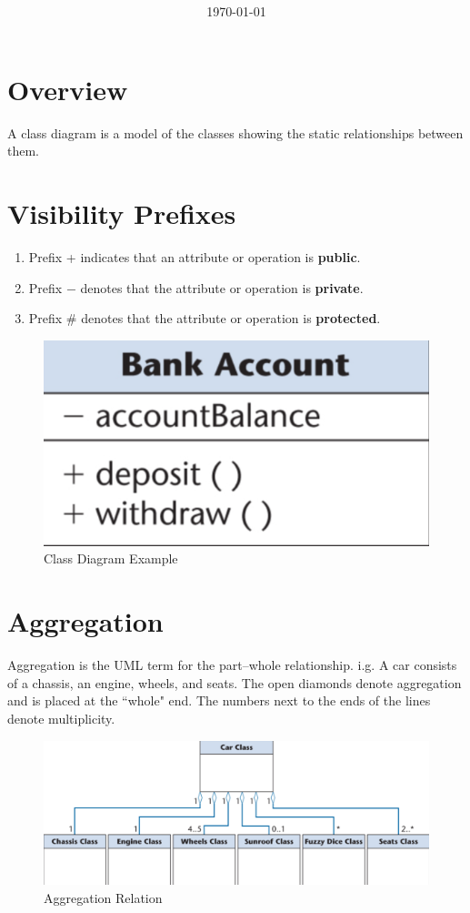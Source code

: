 \documentclass[11pt]{article}
\title{\textbf{\Topic}}
\author{\Name}
\date{\today}
\begin{document}
\maketitle
\noindent\makebox[\linewidth]{\rule[8pt]{5in}{0.5pt}}

\section*{Overview}

A class diagram is a model of the classes showing the static relationships between them.

\section*{Visibility Prefixes}

\begin{enumerate}
	\item Prefix + indicates that an attribute or operation is \textbf{public}.
	\item Prefix $-$ denotes that the attribute or operation is \textbf{private}.
	\item Prefix \# denotes that the attribute or operation is \textbf{protected}.
\end{enumerate}

\begin{figure}[h]
	\centering
	\includegraphics[width=0.3\linewidth]{images/SingleClass.png}
	\caption{Class Diagram Example}
	\label{fig:SingleClass}
\end{figure}

\newpage
\section*{Aggregation}

Aggregation is the UML term for the part–whole relationship. i.g. A car consists of a chassis, an engine, wheels, and seats. The open diamonds denote aggregation and is placed at the ``whole" end. The numbers next to the ends of the lines denote multiplicity.

\begin{figure}[h]
	\centering
	\includegraphics[width=0.8\linewidth]{images/Aggregation.png}
	\caption{Aggregation Relation}
	\label{fig:Aggregation}
\end{figure}
\end{document}
